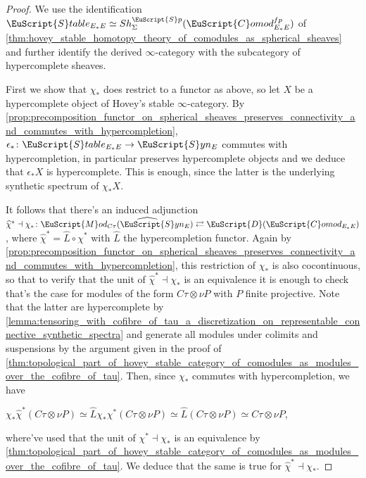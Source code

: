 \documentclass[oneside,a4paper]{amsart}
\newcommand{\euscr}[1]{\EuScript{#1}} %
\newcommand{\dcat}{\euscr{D}} %
\newcommand{\spectra}{\euscr{S}p} %
\newcommand{\stableE}{\euscr{S}table_{E_{*}E}} %
\newcommand{\synspectra}{\euscr{S}yn} %
\newcommand{\hpsynspectra}{\widehat{\euscr{S}}yn} %
\newcommand{\Comod}{\euscr{C}omod} %
\newcommand{\ComodE}{\Comod_{E_{*}E}} %
\newcommand{\Mod}{\euscr{M}od} %
\theoremstyle{plain}
\theoremstyle{definition}
\theoremstyle{remark}
\begin{document}
\begin{proof}
We use the identification $\stableE \simeq Sh_{\Sigma}^{\spectra}(\ComodE^{fp})$ of \cref{thm:hovey_stable_homotopy_theory_of_comodules_as_spherical_sheaves} and further identify the derived $\infty$-category with the subcategory of hypercomplete sheaves. 

First we show that $\chi_{*}$ does restrict to a functor as above, so let $X$ be a hypercomplete object of Hovey's stable $\infty$-category. By \cref{prop:precomposition_functor_on_spherical_sheaves_preserves_connectivity_and_commutes_with_hypercompletion}, $\epsilon_{*} \colon \stableE \rightarrow \synspectra_{E}$ commutes with hypercompletion, in particular preserves hypercomplete objects and we deduce that $\epsilon_{*} X$ is hypercomplete. This is enough, since the latter is the underlying synthetic spectrum of $\chi_{*} X$.

It follows that there's an induced adjunction $\widehat{\chi}^{*} \dashv \chi_{*} \colon \Mod_{C\tau}(\hpsynspectra_{E}) \rightleftarrows \dcat(\ComodE)$, where $\widehat{\chi}^{*} = \widehat{L} \circ \chi^{*}$ with $\widehat{L}$ the hypercompletion functor. Again by \cref{prop:precomposition_functor_on_spherical_sheaves_preserves_connectivity_and_commutes_with_hypercompletion}, this restriction of $\chi_{*}$ is also cocontinuous, so that to verify that the unit of $\widehat{\chi}^{*} \dashv \chi_{*}$ is an equivalence it is enough to check that's the case for modules of the form $C \tau \otimes \nu P$ with $P$ finite projective. Note that the latter are hypercomplete by \cref{lemma:tensoring_with_cofibre_of_tau_a_discretization_on_representable_connective_synthetic_spectra} and generate all modules under colimits and suspensions by the argument given in the proof of \cref{thm:topological_part_of_hovey_stable_category_of_comodules_as_modules_over_the_cofibre_of_tau}. Then, since $\chi_{*}$ commutes with hypercompletion, we have 

\begin{center}
$\chi_{*} \widehat{\chi}^{*} (C\tau \otimes \nu P) \simeq \widehat{L} \chi_{*} \chi^{*} (C\tau \otimes \nu P) \simeq \widehat{L} (C\tau \otimes \nu P) \simeq C \tau \otimes \nu P$,
\end{center} 
where've used that the unit of $\chi^{*} \dashv \chi_{*}$ is an equivalence by \cref{thm:topological_part_of_hovey_stable_category_of_comodules_as_modules_over_the_cofibre_of_tau}. We deduce that the same is true for $\widehat{\chi}^{*} \dashv \chi_{*}$. 


\end{proof}
\end{document}
